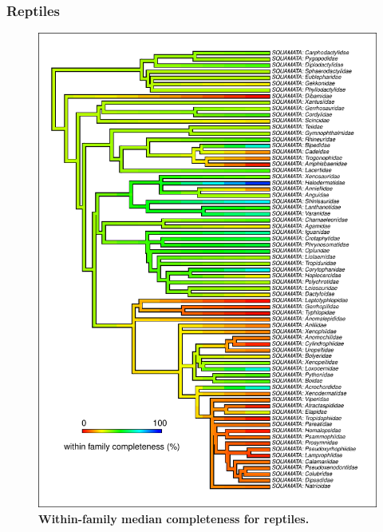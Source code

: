 \documentclass[11pt]{article}
\begin{document}
\subsubsection{Reptiles}
\begin{figure}[h!]
\centering
\includegraphics[scale=1.2]{figures/NA_phylo_patterns/Reptiles_completeness}
\caption[Within-family median completeness for reptiles]{\textbf{Within-family median completeness for reptiles.}}
\label{compPREDICTS}
\end{figure}
\end{document}
